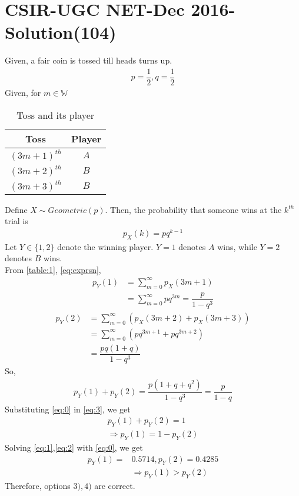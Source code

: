 \documentclass[journal,12pt,twocolumn]{IEEEtran}
\begin{document}
\section*{CSIR-UGC NET-Dec 2016-Solution(104)}
Given, a fair coin is tossed till heads turns up.
\begin{align}
\tag{104.1}
\label{eq:0}
    p=\dfrac{1}{2},q=\dfrac{1}{2}
\end{align}
Given, for $ m \in \mathbb{W}$
\begin{table}[h!]
\centering
\caption{Toss and its player}
\label{table:1}
\begin{tabular}{|c|c|}
    \hline
    Toss & Player \\
    \hline
    $(3m+1)^{th}$ & $A$\\[1ex]
    \hline
    $(3m+2)^{th}$ & $B$\\[1ex]
    \hline
    $(3m+3)^{th}$ & $B$\\[1ex]
    \hline
\end{tabular}
\end{table}
\newline
Define $X\sim Geometric(p)$. Then, the probability that someone wins at the $k^{th}$ trial is
\begin{align}
\tag{104.2}
\label{eq:exprsn}
    p_{X}(k)=pq^{k-1}
\end{align}
Let $Y \in \{ 1,2\}$ denote the winning player. $Y=1$ denotes $A$ wins, while $Y=2$ denotes $B$ wins.\\
From \eqref{table:1}, \eqref{eq:exprsn},
\begin{align}
\tag{104.3}
    p_{Y}(1)&=\displaystyle\sum_{m=0}^{\infty}p_{X}(3m+1)\\
\tag{104.4}
\label{eq:1}
    &=\displaystyle\sum_{m=0}^{\infty}pq^{3m}=\dfrac{p}{1-q^{3}}
\end{align}
\begin{align}
\tag{104.5}
    p_{Y}(2)&=\displaystyle\sum_{m=0}^{\infty}(p_{X}(3m+2)+p_{X}(3m+3))\\ 
\tag{104.6}
    &=\displaystyle\sum_{m=0}^{\infty}(pq^{3m+1}+pq^{3m+2})\\
\tag{104.7}
\label{eq:2}
    &=\dfrac{pq(1+q)}{1-q^{3}}
\end{align}
So,
\begin{align}
\tag{104.8}
\label{eq:3}
    p_{Y}(1)+p_{Y}(2)=\dfrac{p(1+q+q^{2})}{1-q^{3}}=\dfrac{p}{1-q}
\end{align}
Substituting \eqref{eq:0} in \eqref{eq:3}, we get
\begin{align}
\tag{104.9}
     p_{Y}(1)+p_{Y}(2)=1\\
\tag{104.10}
    \Rightarrow p_{Y}(1)=1-p_{Y}(2)
\end{align}
Solving \eqref{eq:1},\eqref{eq:2} with \eqref{eq:0}, we get
\begin{align}
\tag{104.11}
    p_{Y}(1)=&0.5714, p_{Y}(2)=0.4285\\
\tag{104.12}
    &\Rightarrow p_{Y}(1)>p_{Y}(2)
\end{align}
Therefore, options $3),4)$ are correct.\\
\end{document}
